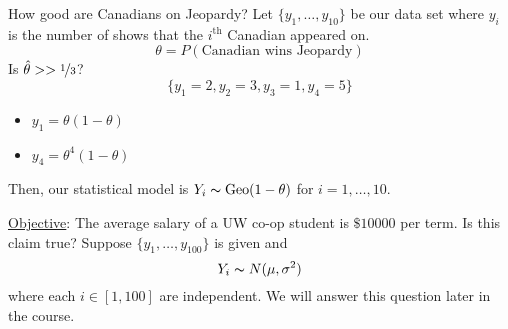 \begin{exbox}
    \begin{example}
        How good are Canadians on Jeopardy? Let $ \{y_1,\ldots ,y_{10}\} $
        be our data set where $ y_i $ is the number of shows that the
        $ i^{\text{th}} $ Canadian appeared on.
        \[ \theta=P(\text{Canadian wins Jeopardy}) \]
        Is $ \hat{\theta}>>\nicefrac{1}{3} $?
        \[ \{y_1=2,y_2=3,y_3=1,y_4=5\} \]
        \begin{itemize}
            \item $ y_1=\theta(1-\theta) $
            \item $ y_4=\theta^4(1-\theta) $
        \end{itemize}
        Then, our statistical model is $ Y_i \thicksim \operatorname{Geo}(1-\theta) $
        for $ i=1,\ldots ,10 $.
    \end{example}
\end{exbox}
\underline{Objective}: The average salary of a UW co-op student is $ \$10000 $ per term.
Is this claim true? Suppose $ \{y_1,\ldots ,y_{100}\} $ is given and
\[ Y_i \thicksim N(\mu,\sigma^2) \]
where each $ i\in[1,100] $ are independent. We will answer this question later in the course.
